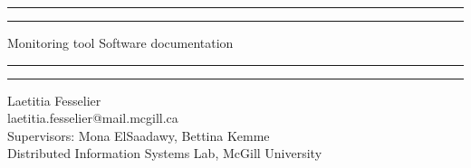 \documentclass[12pt,hidelinks]{article}
\begin{document}
\begin{titlepage}
	\centering %
	\scshape %
	\vspace*{1.5\baselineskip} %

	\rule{13cm}{1.6pt}\vspace*{-\baselineskip}\vspace*{2pt} %
	\rule{13cm}{0.4pt} %
	
		\vspace{0.75\baselineskip} %
    {	\Huge Monitoring tool Software documentation \\  }
		\vspace{0.75\baselineskip} %
	\rule{13cm}{0.4pt}\vspace*{-\baselineskip}\vspace{3.2pt} %
	\rule{13cm}{1.6pt} %
	
		\vspace{1.75\baselineskip} %
	{\large Laetitia Fesselier \\
	laetitia.fesselier@mail.mcgill.ca} \\
	Supervisors: Mona ElSaadawy, Bettina Kemme \\
	\vfill
Distributed Information Systems Lab, McGill University \\
\end{titlepage}

\tableofcontents
\end{document}
